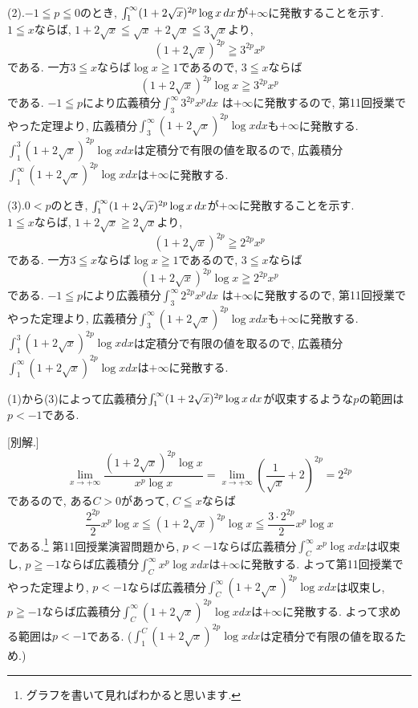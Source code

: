 \documentclass[dvipdfmx,a4paper,11pt]{article}
\theoremstyle{definition}
\begin{document}
(2).$-1 \leqq p \leqq 0$のとき, $\int_{1}^{\infty} (1+2\sqrt{x})^{2p} \log x \text{\,}dx$が$+ \infty$に発散することを示す. \\
$1 \leqq x$ならば, $1 + 2 \sqrt{x} \leqq \sqrt{x} + 2 \sqrt{x} \leqq 3\sqrt{x} $より, 
$$
(1 + 2 \sqrt{x})^{2p} \geqq 3^{2p} x^{p}
$$
である. 一方$3 \leqq x$ならば$\log x \geqq 1$であるので, 
$3 \leqq x$ならば
$$
(1 + 2 \sqrt{x})^{2p} \log x \geqq 3^{2p} x^{p}
$$
である. $-1 \leqq p$により広義積分$\int_{3}^{\infty} 3^{2p} x^{p} dx$ は$+ \infty$に発散するので, 
第11回授業でやった定理より, 広義積分$\int_{3}^{\infty} (1 + 2 \sqrt{x})^{2p} \log x dx$も$+ \infty$に発散する.
$\int_{1}^{3} (1 + 2 \sqrt{x})^{2p} \log x dx$は定積分で有限の値を取るので, 広義積分
$\int_{1}^{\infty} (1 + 2 \sqrt{x})^{2p} \log x dx$は$+ \infty$に発散する.

(3).$0 < p$のとき, $\int_{1}^{\infty} (1+2\sqrt{x})^{2p} \log x \text{\,}dx$が$+ \infty$に発散することを示す. \\
$1 \leqq x$ならば, $1 + 2 \sqrt{x} \geqq 2 \sqrt{x} $より, 
$$
(1 + 2 \sqrt{x})^{2p} \geqq 2^{2p} x^{p}
$$
である. 一方$3 \leqq x$ならば$\log x \geqq 1$であるので, 
$3 \leqq x$ならば
$$
(1 + 2 \sqrt{x})^{2p} \log x \geqq 2^{2p} x^{p}
$$
である. $-1 \leqq p$により広義積分$\int_{3}^{\infty} 2^{2p} x^{p} dx$ は$+ \infty$に発散するので, 
第11回授業でやった定理より, 広義積分$\int_{3}^{\infty} (1 + 2 \sqrt{x})^{2p} \log x dx$も$+ \infty$に発散する.
$\int_{1}^{3} (1 + 2 \sqrt{x})^{2p} \log x dx$は定積分で有限の値を取るので, 広義積分
$\int_{1}^{\infty} (1 + 2 \sqrt{x})^{2p} \log x dx$は$+ \infty$に発散する.

(1)から(3)によって広義積分$\int_{1}^{\infty} (1+2\sqrt{x})^{2p} \log x \text{\,}dx $が収束するような$p$の範囲は$p <-1$である.

[別解.]
$$
\lim_{x \rightarrow + \infty} \frac{(1 + 2 \sqrt{x})^{2p} \log x}{ x^{p} \log x }
=
\lim_{x \rightarrow + \infty} \left( \frac{1}{\sqrt{x}} + 2 \right)^{2p}
= 2^{2p}
$$
であるので, ある$C>0$があって, $C \leqq x$ならば
$$
\frac{2^{2p}}{2}  x^{p} \log x \leqq (1 + 2 \sqrt{x})^{2p} \log x \leqq  \frac{3\cdot2^{2p}}{2}  x^{p} \log x
$$
である.\footnote{グラフを書いて見ればわかると思います.}
第11回授業演習問題から, $p < -1$ならば広義積分$\int_{C}^{\infty} x^{p} \log x dx$は収束し, $p \geqq -1$ならば広義積分$\int_{C}^{\infty} x^{p} \log x dx$は$+\infty$に発散する.
よって第11回授業でやった定理より, $p < -1$ならば広義積分$\int_{C}^{\infty} (1 + 2 \sqrt{x})^{2p} \log xdx$は収束し, $p \geqq -1$ならば広義積分$\int_{C}^{\infty} (1 + 2 \sqrt{x})^{2p} \log xdx$は$+\infty$に発散する.
よって求める範囲は$p <-1$である. ($\int^{C}_{1}(1 + 2 \sqrt{x})^{2p} \log x dx$は定積分で有限の値を取るため.)
\end{document}
